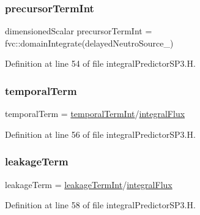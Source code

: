 \subsubsection{\texorpdfstring{precursor\+Term\+Int}{precursorTermInt}}
{\footnotesize\ttfamily dimensioned\+Scalar precursor\+Term\+Int = fvc\+::domain\+Integrate(delayed\+Neutro\+Source\+\_\+)}



Definition at line 54 of file integral\+Predictor\+S\+P3.\+H.

\mbox{\label{integralPredictorSP3_8H_aaef87b89b227970fd6792c5bff5dcf92}} 
\subsubsection{\texorpdfstring{temporal\+Term}{temporalTerm}}
{\footnotesize\ttfamily temporal\+Term = \hyperlink{integralPredictorSP3_8H_a6a6bc2b4b802b67f7144e4fd168ce1b5}{temporal\+Term\+Int}/\hyperlink{integralPredictorSP3_8H_a2a0b08b13037e807e2dd9a5db5f493fa}{integral\+Flux}}



Definition at line 56 of file integral\+Predictor\+S\+P3.\+H.

\mbox{\label{integralPredictorSP3_8H_a3870febfb4d6b903e191a3f6937b92e7}} 
\subsubsection{\texorpdfstring{leakage\+Term}{leakageTerm}}
{\footnotesize\ttfamily leakage\+Term = \hyperlink{integralPredictorSP3_8H_a1edc21b2e8fa9d1796ee10236abc2889}{leakage\+Term\+Int}/\hyperlink{integralPredictorSP3_8H_a2a0b08b13037e807e2dd9a5db5f493fa}{integral\+Flux}}



Definition at line 58 of file integral\+Predictor\+S\+P3.\+H.

\mbox{\label{integralPredictorSP3_8H_af8dbaf3ece9644da11df447a12a14051}} 
